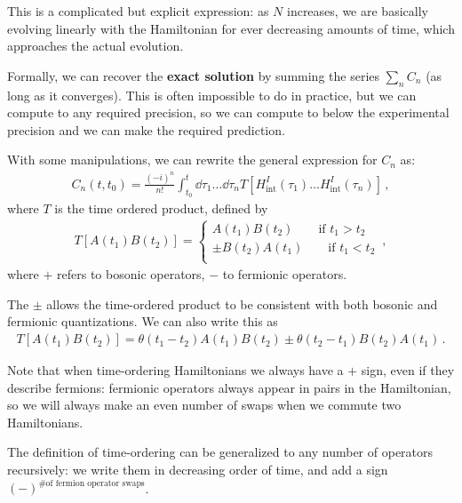 \documentclass[main.tex]{subfiles}
\begin{document}
This is a complicated but explicit expression: as \(N\) increases, we are basically evolving linearly with the Hamiltonian for ever decreasing amounts of time, which approaches the actual evolution. 

Formally, we can recover the \textbf{exact solution} by summing the series \(\sum _{n} C_n\) (as long as it converges). 
This is often impossible to do in practice, but we can compute to any required precision, so we can compute to below the experimental precision and we can make the required prediction. 

\begin{claim}
With some manipulations, we can rewrite the general expression for \(C_n\) as: 
%
\begin{align}
C_n (t, t_0 ) = \frac{(-i)^{n}}{n!} 
\int_{t_0 }^{t} \dd{\tau_1} \dots \dd{\tau_n} T [H _{\text{int}}^{I} (\tau_1 ) \dots H _{\text{int}}^{I}(\tau_{n})] 
\,,
\end{align}
%
where \(T\) is the time ordered product, defined by 
%
\begin{subequations}
\begin{align}
T[A(t_1 ) B(t_2 )]
= \begin{cases}
    A(t_1 ) B(t_2 ) \qquad \text{if } t_1 > t_2 \\
    \pm B(t_2 ) A(t_1 ) \qquad \text{if } t_1 < t_2 \\
\end{cases}
\,,
\end{align}
\end{subequations}
%
where \(+\) refers to bosonic operators, \(-\) to fermionic operators.
\end{claim}

The \(\pm\) allows the time-ordered product to be consistent with both bosonic and fermionic quantizations. 
We can also write this as 
%
\begin{align}
T[A(t_1 ) B(t_2 )]
= \theta (t_1 - t_2 ) A(t_1 ) B(t_2 )
\pm \theta (t_2 - t_1 ) B(t_2 ) A(t_1 )
\,.
\end{align}

Note that when time-ordering Hamiltonians we always have a \(+\) sign, even if they describe fermions: fermionic operators always appear in pairs in the Hamiltonian, so we will always make an even number of swaps when we commute two Hamiltonians. 

The definition of time-ordering can be generalized to any number of operators recursively: we write them in decreasing order of time, and add a sign \((-)^{\text{\# of fermion operator swaps}}\). 
\end{document}
